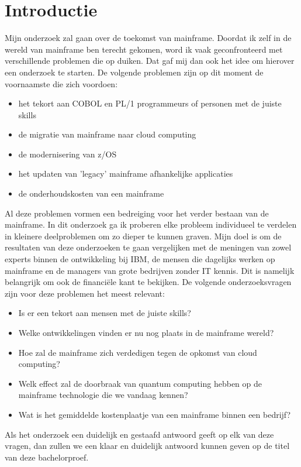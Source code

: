 
\section{Introductie} %
\label{sec:introductie}
Mijn onderzoek zal gaan over de toekomst van mainframe. Doordat ik zelf in de wereld van mainframe ben terecht gekomen, word ik vaak geconfronteerd
met verschillende problemen die op duiken. Dat gaf mij dan ook het idee om hierover een onderzoek te starten. De volgende problemen zijn op dit moment de voornaamste die zich voordoen:
\begin{itemize}
  \item het tekort aan COBOL en PL/1 programmeurs of personen met de juiste skills
  \item de migratie van mainframe naar cloud computing
  \item de modernisering van z/OS
  \item het updaten van 'legacy' mainframe afhankelijke applicaties
  \item de onderhoudskosten van een mainframe
\end{itemize}
Al deze problemen vormen een bedreiging voor het verder bestaan van de mainframe. In dit onderzoek ga ik proberen elke probleem individueel te verdelen in kleinere deelproblemen om zo dieper te kunnen graven. Mijn doel is om de resultaten van deze onderzoeken te gaan vergelijken met de meningen van zowel experts binnen de ontwikkeling bij IBM, de mensen die dagelijks werken op mainframe en de managers van grote bedrijven zonder IT kennis. Dit is namelijk belangrijk om ook de financiële kant te bekijken. De volgende onderzoeksvragen zijn voor deze problemen het meest relevant:
\begin{itemize} 
  \item Is er een tekort aan mensen met de juiste skills?
  \item Welke ontwikkelingen vinden er nu nog plaats in de mainframe wereld?
  \item Hoe zal de mainframe zich verdedigen tegen de opkomst van cloud computing?
  \item Welk effect zal de doorbraak van quantum computing hebben op de mainframe technologie die we vandaag kennen?
  \item Wat is het gemiddelde kostenplaatje van een mainframe binnen een bedrijf?
\end{itemize}
Als het onderzoek een duidelijk en gestaafd antwoord geeft op elk van deze vragen, dan zullen we een klaar en duidelijk antwoord kunnen geven op 
de titel van deze bachelorproef.

